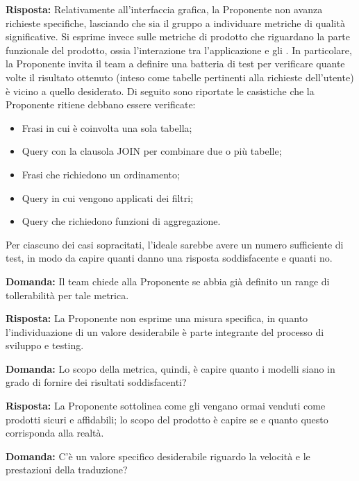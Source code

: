 \par \textbf{Risposta:} Relativamente all'interfaccia grafica, la Proponente non avanza richieste specifiche, lasciando che sia il gruppo a individuare metriche di qualità significative. Si esprime invece sulle metriche di prodotto che riguardano la parte funzionale del prodotto, ossia l'interazione tra l'applicazione e gli . In particolare, la Proponente invita il team a definire una batteria di test per verificare quante volte il risultato ottenuto (inteso come tabelle pertinenti alla richieste dell’utente) è vicino a quello desiderato. Di seguito sono riportate le casistiche che la Proponente ritiene debbano essere verificate:
\begin{itemize}
	\item Frasi in cui è coinvolta una sola tabella;
	\item Query con la clausola JOIN per combinare due o più tabelle;
	\item Frasi che richiedono un ordinamento;
	\item Query in cui vengono applicati dei filtri;
	\item Query che richiedono funzioni di aggregazione.
\end{itemize}
Per ciascuno dei casi sopracitati, l'ideale sarebbe avere un numero sufficiente di test, in modo da capire quanti danno una risposta soddisfacente e quanti no.

\par \textbf{Domanda:} Il team chiede alla Proponente se abbia già definito un range di tollerabilità per tale metrica.

\par \textbf{Risposta:} La Proponente non esprime una misura specifica, in quanto l'individuazione di un valore desiderabile è parte integrante del processo di sviluppo e testing.

\par \textbf{Domanda:} Lo scopo della metrica, quindi, è capire quanto i modelli siano in grado di fornire dei risultati soddisfacenti?

\par \textbf{Risposta:} La Proponente sottolinea come gli  vengano ormai venduti come prodotti sicuri e affidabili; lo scopo del prodotto è capire se e quanto questo corrisponda alla realtà.

\par \textbf{Domanda:} C'è un valore specifico desiderabile riguardo la velocità e le prestazioni della traduzione?


